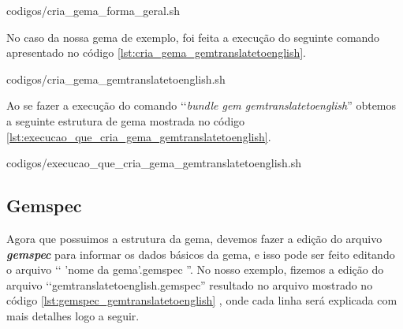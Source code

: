 
{codigos/cria_gema_forma_geral.sh}

No caso da nossa gema de exemplo, foi feita a execução do seguinte comando apresentado no código 
\ref{lst:cria_gema_gemtranslatetoenglish}.


{codigos/cria_gema_gemtranslatetoenglish.sh}

Ao se fazer a execução do comando ‘‘\emph{bundle gem gemtranslatetoenglish}'' obtemos a seguinte estrutura de gema mostrada 
no código \ref{lst:execucao_que_cria_gema_gemtranslatetoenglish}.


{codigos/execucao_que_cria_gema_gemtranslatetoenglish.sh}

\subsection{Gemspec}
\label{subsection:gemspec}

Agora que possuimos a estrutura da gema, devemos fazer a edição do arquivo \emph{\textbf{gemspec}} 
para informar os dados básicos da gema, e isso pode ser feito editando o arquivo ‘‘ 'nome da gema'.gemspec ''. 
No nosso exemplo, fizemos a edição do arquivo ‘‘gemtranslatetoenglish.gemspec'' resultado no arquivo mostrado 
no código \ref{lst:gemspec_gemtranslatetoenglish}
, onde cada linha será explicada com mais detalhes logo a seguir.

